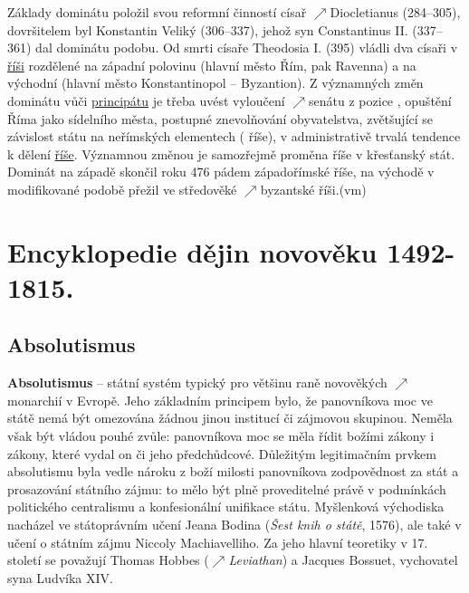 \documentclass{article}
\begin{document}
  Základy dominátu položil svou reformní činností císař $\nearrow$Diocletianus (284--305), dovršitelem byl Konstantin Veliký (306--337), jehož syn Constantinus II. (337--361) dal dominátu  podobu. Od smrti císaře Theodosia I. (395) vládli dva císaři v \hyperref[sec:rise]{říši} rozdělené na západní polovinu (hlavní město Řím, pak Ravenna) a na východní (hlavní město Konstantinopol -- Byzantion). Z významných změn dominátu vůči \hyperref[sec:]{principátu} je třeba uvést vyloučení $\nearrow$senátu z pozice , opuštění Říma jako sídelního města, postupné znevolňování obyvatelstva, zvětšující se závislost státu na neřímských elementech ( říše), v administrativě trvalá tendence k dělení \hyperref[sec:rise]{říše}. Významnou změnou je samozřejmě proměna říše v křesťanský stát. Dominát na západě skončil roku 476 pádem západořímské říše, na východě v modifikované podobě přežil ve středověké $\nearrow$byzantské říši.\hfill (vm)

  \section*{Encyklopedie dějin novověku 1492-1815.}
  \subsection*{Absolutismus~\cite{Hroch:}}
  \label{sec:absolutismus}

  {\bf Absolutismus} -- státní systém typický pro většinu raně novověkých $\nearrow$monarchií v Evropě. Jeho základním principem bylo, že panovníkova moc ve státě nemá být omezována žádnou jinou institucí či zájmovou skupinou. Neměla však být vládou pouhé zvůle: panovníkova moc se měla řídit božími zákony i zákony, které vydal on či jeho předchůdcové. Důležitým legitimačním prvkem absolutismu byla vedle nároku z boží milosti panovníkova zodpovědnost za stát a prosazování státního zájmu: to mělo být plně proveditelné právě v podmínkách politického centralismu a konfesionální unifikace státu. Myšlenková východiska nacházel ve státoprávním učení Jeana Bodina ({\it Šest knih o státě}, 1576), ale také v učení o státním zájmu Niccoly Machiavelliho. Za jeho hlavní teoretiky v 17. století se považují Thomas Hobbes ($\nearrow${\it Leviathan}) a Jacques Bossuet, vychovatel syna Ludvíka XIV.
\end{document}
